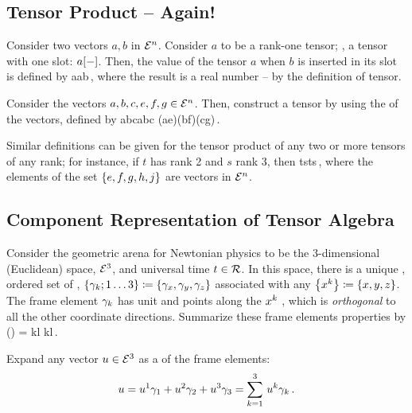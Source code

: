 \subsection{Tensor Product -- Again!}
Consider two vectors $a,b$ in $\mathcal{E}^{n}$. Consider $a$ to be a rank-one tensor; \ie, a tensor with one slot: $a\!\left[{-}\right]$. Then, the value of the tensor $a$ when $b$ is inserted in its slot is defined by
\beq
a a\iprod b\,,
\eeq
where the result is a real number -- by the definition of tensor.

Consider the vectors $a,b,c,e,f,g\in\mathcal{E}^{n}$. Then, construct a tensor by using the  of the vectors, defined by
\beq
a\tprod b\tprod c abc
                             (a\iprod e)(b\iprod f)(c\iprod g)\,.
\eeq

\begin{remark}
Similar definitions can be given for the tensor product of any two or more tensors of any rank; for instance, if $t$ has rank 2 and $s$ rank 3, then
\beq
t\tprod s ts\,,
\eeq
where the elements of the set $\left\lbrace{e,f,g,h,j}\right\rbrace$ are vectors in $\mathcal{E}^{n}$.
\end{remark}


\subsection{Component Representation of Tensor Algebra}
Consider the geometric arena for Newtonian physics to be the 3-dimensional (Euclidean) space, $\mathcal{E}^{3}$, and universal time $t\in\mathcal{R}$. In this space, there is a unique , \aka ordered set of , $\left\lbrace{\gamma_{k};{1}\dotsc{3}}\right\rbrace\coloneqq\left\lbrace{\gamma_{x}, \gamma_{y}, \gamma_{z}}\right\rbrace$ associated with any  $\left\lbrace{{x}^{k}}\right\rbrace\coloneqq\left\lbrace{x,y,z}\right\rbrace$. The frame element $\gamma_{k}$ has unit  and points along the ${x}^{k}$ , which is \emph{orthogonal} to all the other coordinate directions. Summarize these frame elements properties by
\beq
{}() = \nbvec k\iprod\nbvec l  \ikron kl\,.
\eeq

Expand any vector $u\in\mathcal{E}^{3}$ as a  of the frame elements:
\begin{equation}\label{eq:vectorexpansioninthreedim}
u = {u}^{1}\gamma_{1} + {u}^{2}\gamma_{2} + {u}^{3}\gamma_{3} 
  = \sum_{k = 1}^{3}\,{u}^{k}\gamma_{k}\,.
\end{equation}

